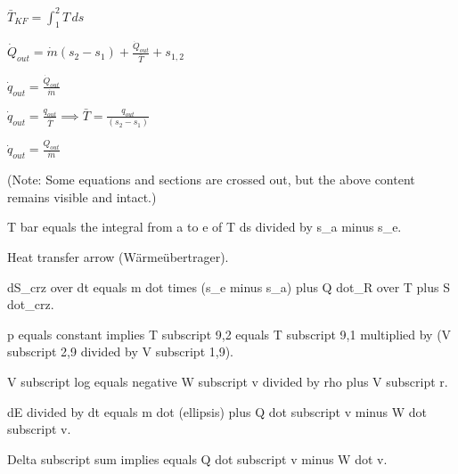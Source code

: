 \( \bar{T}_{KF} = \int_1^2 T \, ds \)  

\( \dot{Q}_{out} = \dot{m} (s_2 - s_1) + \frac{\dot{Q}_{out}}{\bar{T}} + s_{1,2} \)  

\( \dot{q}_{out} = \frac{\dot{Q}_{out}}{\dot{m}} \)  

\( \dot{q}_{out} = \frac{q_{out}}{\bar{T}} \implies \bar{T} = \frac{q_{out}}{(s_2 - s_1)} \)  

\( \dot{q}_{out} = \frac{Q_{out}}{\dot{m}} \)  

(Note: Some equations and sections are crossed out, but the above content remains visible and intact.)

T bar equals the integral from a to e of T ds divided by s_a minus s_e.  

Heat transfer arrow (Wärmeübertrager).  

dS_crz over dt equals m dot times (s_e minus s_a) plus Q dot_R over T plus S dot_crz.

p equals constant implies T subscript 9,2 equals T subscript 9,1 multiplied by (V subscript 2,9 divided by V subscript 1,9).  

V subscript log equals negative W subscript v divided by rho plus V subscript r.  

dE divided by dt equals m dot (ellipsis) plus Q dot subscript v minus W dot subscript v.  

Delta subscript sum implies equals Q dot subscript v minus W dot v.